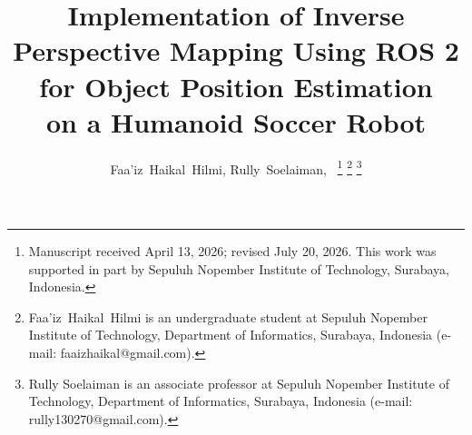 \documentclass[journal]{IAENGtran}
\begin{document}
%
\title{Implementation of Inverse Perspective Mapping Using ROS 2 for Object Position Estimation \\ on a Humanoid Soccer Robot}
%
%
%

\author{Faa'iz~Haikal~Hilmi,
        Rully~Soelaiman,~%
\thanks{Manuscript received April 13, 2026; revised July 20, 2026. This
work was supported in part by Sepuluh Nopember Institute of Technology,
Surabaya, Indonesia.}
\thanks{Faa'iz~Haikal~Hilmi is an undergraduate student at Sepuluh Nopember Institute
of Technology, Department of Informatics, Surabaya, Indonesia (e-mail:
faaizhaikal@gmail.com).}%
\thanks{Rully Soelaiman is an associate professor at Sepuluh Nopember Institute
of Technology, Department of Informatics, Surabaya, Indonesia (e-mail:
rully130270@gmail.com).
}
}%



%
%



%
\end{document}

